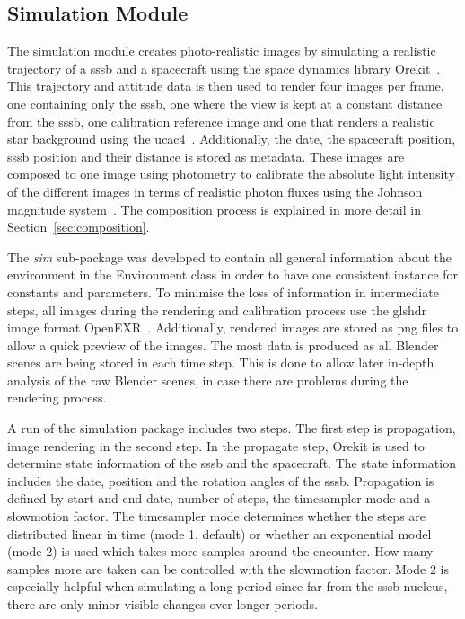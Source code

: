 

\subsection{Simulation Module}
The simulation module creates photo-realistic images by simulating a realistic trajectory of a \gls{sssb} and a spacecraft using the space dynamics library Orekit~\cite{orekit}. This trajectory and attitude data is then used to render four images per frame, one containing only the \gls{sssb}, one where the view is kept at a constant distance from the \gls{sssb}, one calibration reference image and one that renders a realistic star background using the \gls{ucac4}~\cite{zacharias2013fourthUCAC4}. Additionally, the date, the spacecraft position, \gls{sssb} position and their distance is stored as metadata. These images are composed to one image using photometry to calibrate the absolute light intensity of the different images in terms of realistic photon fluxes using the Johnson magnitude system~\cite{Bessell1979UBVRIPhotometry}. The composition process is explained in more detail in Section~\ref{sec:composition}.

The \textit{sim} sub-package was developed to contain all general information about the environment in the Environment class in order to have one consistent instance for constants and parameters. To minimise the loss of information in intermediate steps, all images during the rendering and calibration process use the gls{hdr} image format OpenEXR~\cite{openexr}. Additionally, rendered images are stored as \gls{png} files to allow a quick preview of the images. The most data is produced as all Blender scenes are being stored in each time step. This is done to allow later in-depth analysis of the raw Blender scenes, in case there are problems during the rendering process.

A run of the simulation package includes two steps. The first step is propagation, image rendering in the second step.
In the propagate step, Orekit is used to determine state information of the \gls{sssb} and the spacecraft. The state information includes the date, position and the rotation angles of the \gls{sssb}. Propagation is defined by start and end date, number of steps, the timesampler mode and a slowmotion factor.
The timesampler mode determines whether the steps are distributed linear in time (mode 1, default) or whether an exponential model (mode 2) is used which takes more samples around the encounter. How many samples more are taken can be controlled with the slowmotion factor. Mode 2 is especially helpful when simulating a long period since far from the \gls{sssb} nucleus, there are only minor visible changes over longer periods.

